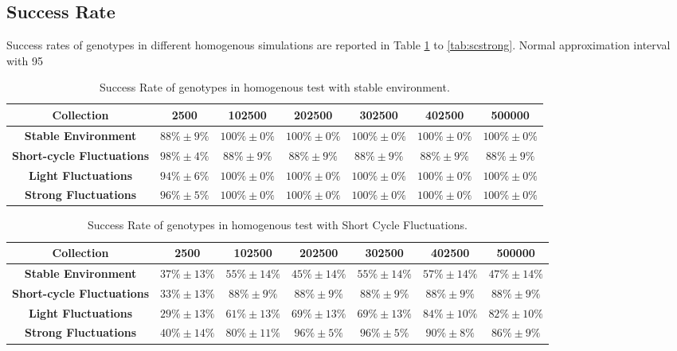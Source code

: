 \subsection{Success Rate}
Success rates of genotypes in different homogenous simulations are reported in Table \ref{tab:scstable} to \ref{tab:scstrong}.
Normal approximation interval with 95%

\begin{table}
\caption{Success Rate of genotypes in homogenous test with stable environment.\label{tab:scstable}}
\scriptsize
\begin{tabular}{ccccccc}
\toprule%
{\textbf{Collection}} & {\textbf{2500}} & \textbf{102500} & \textbf{202500} &\textbf{302500} &\textbf{402500} &\textbf{500000} \tabularnewline
\toprule%
\textbf{Stable Environment} & $88\%\pm9\%$ & $100\%\pm0\%$ & $100\%\pm0\%$ & $100\%\pm0\%$ & $100\%\pm0\%$ & $100\%\pm0\%$\tabularnewline

\textbf{Short-cycle Fluctuations} & $98\%\pm4\%$ & $88\%\pm9\%$ & $88\%\pm9\%$ & $88\%\pm9\%$ & $88\%\pm9\%$ & $88\%\pm9\%$\tabularnewline

\textbf{Light Fluctuations} & $94\%\pm6\%$ & $100\%\pm0\%$ & $100\%\pm0\%$ & $100\%\pm0\%$ & $100\%\pm0\%$ & $100\%\pm0\%$\tabularnewline

\textbf{Strong Fluctuations} & $96\%\pm5\%$ & $100\%\pm0\%$ & $100\%\pm0\%$ & $100\%\pm0\%$ & $100\%\pm0\%$ & $100\%\pm0\%$\tabularnewline

\bottomrule%
\end{tabular}%
\end{table} 

\begin{table}
\caption{Success Rate of genotypes in homogenous test with Short Cycle Fluctuations.\label{tab:scshort}}
\scriptsize
\begin{tabular}{ccccccc}
\toprule%
{\textbf{Collection}} & {\textbf{2500}} & \textbf{102500} & \textbf{202500} &\textbf{302500} &\textbf{402500} &\textbf{500000} \tabularnewline
\toprule%

\textbf{Stable Environment} & $37\%\pm13\%$ & $55\%\pm14\%$ & $45\%\pm14\%$ & $55\%\pm14\%$ & $57\%\pm14\%$ & $47\%\pm14\%$ \tabularnewline
\textbf{Short-cycle Fluctuations} & $33\%\pm13\%$ & $88\%\pm9\%$ & $88\%\pm9\%$ & $88\%\pm9\%$ & $88\%\pm9\%$ & $88\%\pm9\%$ \tabularnewline
\textbf{Light Fluctuations} &$29\%\pm13\%$ & $61\%\pm13\%$ & $69\%\pm13\%$ & $69\%\pm13\%$ & $84\%\pm10\%$ & $82\%\pm10\%$ \tabularnewline
\textbf{Strong Fluctuations} &$40\%\pm14\%$ & $80\%\pm11\%$ & $96\%\pm5\%$ & $96\%\pm5\%$ & $90\%\pm8\%$ & $86\%\pm9\%$\tabularnewline

\bottomrule%
\end{tabular}%
\end{table} 

